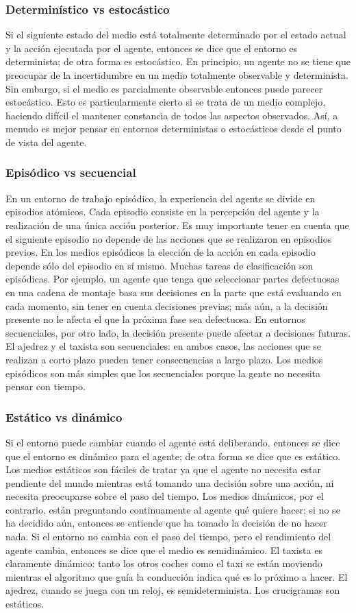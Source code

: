 \documentclass[12pt,a4paper]{report}
\begin{document}
\subsubsection{Determinístico vs estocástico}
Si el siguiente estado del medio está totalmente determinado por el estado actual y la acción ejecutada por el agente, entonces se dice que el entorno es determinista; de otra forma es estocástico. En principio, un agente no se tiene que preocupar de la incertidumbre en un medio totalmente observable y determinista. Sin embargo, si el medio es parcialmente observable entonces puede parecer estocástico. Esto es particularmente cierto si se trata de un medio complejo, haciendo difícil el mantener constancia de todos las aspectos observados. Así, a menudo es mejor pensar en entornos deterministas o estocásticos desde el punto de vista del agente.
\subsubsection{Episódico vs secuencial}
En un entorno de trabajo episódico, la experiencia del agente se divide en episodios atómicos. Cada episodio consiste en la percepción del agente y la realización de una única acción posterior. Es muy importante tener en cuenta que el siguiente episodio no depende de las acciones que se realizaron en episodios previos. En los medios episódicos la elección de la acción en cada episodio depende sólo del episodio en sí mismo. Muchas tareas de clasificación son episódicas. Por ejemplo, un agente que tenga que seleccionar partes defectuosas en una cadena de montaje basa sus decisiones en la parte que está evaluando en cada momento, sin tener en cuenta decisiones previas; más aún, a la decisión presente no le afecta el que la próxima fase sea defectuosa. En entornos secuenciales, por otro lado, la decisión presente puede afectar a decisiones futuras. El ajedrez y el taxista son secuenciales: en ambos casos, las acciones que se realizan a corto plazo pueden tener consecuencias a largo plazo. Los medios episódicos son más simples que los secuenciales porque la gente no necesita pensar con tiempo.
\subsubsection{Estático vs dinámico}
Si el entorno puede cambiar cuando el agente está deliberando, entonces se dice que el entorno es dinámico para el agente; de otra forma se dice que es estático. Los medios estáticos son fáciles de tratar ya que el agente no necesita estar pendiente del mundo mientras está tomando una decisión sobre una acción, ni necesita preocuparse sobre el paso del tiempo. Los medios dinámicos, por el contrario, están preguntando continuamente al agente qué quiere hacer; si no se ha decidido aún, entonces se entiende que ha tomado la decisión de no hacer nada. Si el entorno no cambia con el paso del tiempo, pero el rendimiento del agente cambia, entonces se dice que el medio es semidinámico. El taxista es claramente dinámico: tanto los otros coches como el taxi se están moviendo mientras el algoritmo que guía la conducción indica qué es lo próximo a hacer. El ajedrez, cuando se juega con un reloj, es semideterminista. Los crucigramas son estáticos.
\end{document}

